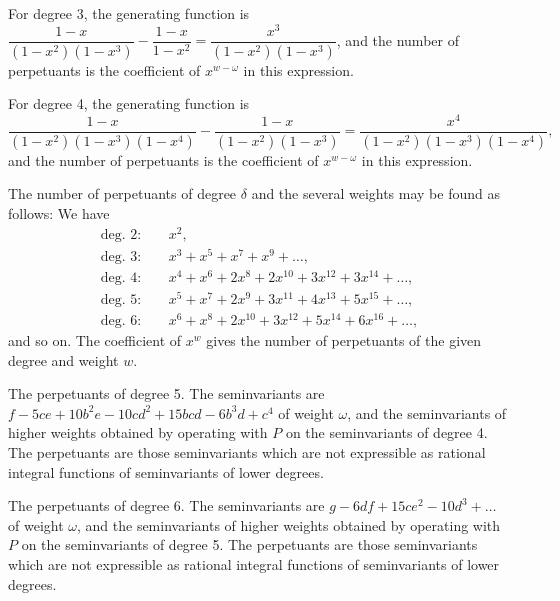 \documentclass[11pt,a4paper]{book}
\begin{document}
{{{\begin{art}
For degree 3, the generating function is $\dfrac{1 - x}{(1 - x^{2})(1 - x^{3})} - \dfrac{1 - x}{1 - x^{2}} = \dfrac{x^{3}}{(1 - x^{2})(1 - x^{3})}$, and the number of perpetuants is the coefficient of $x^{w - \omega}$ in this expression.

For degree 4, the generating function is
\[
\frac{1 - x}{(1 - x^{2})(1 - x^{3})(1 - x^{4})} - \frac{1 - x}{(1 - x^{2})(1 - x^{3})} = \frac{x^{4}}{(1 - x^{2})(1 - x^{3})(1 - x^{4})},
\]
and the number of perpetuants is the coefficient of $x^{w - \omega}$ in this expression.
\end{art}

\setcounter{art}{59}
\begin{art}
The number of perpetuants of degree $\delta$ and the several weights may be found as follows: We have
\begin{align*}
\text{deg. } 2:\quad & x^{2},\\
\text{deg. } 3:\quad & x^{3} + x^{5} + x^{7} + x^{9} + \ldots,\\
\text{deg. } 4:\quad & x^{4} + x^{6} + 2x^{8} + 2x^{10} + 3x^{12} + 3x^{14} + \ldots,\\
\text{deg. } 5:\quad & x^{5} + x^{7} + 2x^{9} + 3x^{11} + 4x^{13} + 5x^{15} + \ldots,\\
\text{deg. } 6:\quad & x^{6} + x^{8} + 2x^{10} + 3x^{12} + 5x^{14} + 6x^{16} + \ldots,
\end{align*}
and so on. The coefficient of $x^{w}$ gives the number of perpetuants of the given degree and weight $w$.
\end{art}

\setcounter{art}{60}
\begin{art}
The perpetuants of degree 5. The seminvariants are $f - 5ce + 10b^{2}e - 10cd^{2} + 15bcd - 6b^{3}d + c^{4}$ of weight $\omega$, and the seminvariants of higher weights obtained by operating with $P$ on the seminvariants of degree 4. The perpetuants are those seminvariants which are not expressible as rational integral functions of seminvariants of lower degrees.
\end{art}

\setcounter{art}{61}
\begin{art}
The perpetuants of degree 6. The seminvariants are $g - 6df + 15ce^{2} - 10d^{3} + \ldots$ of weight $\omega$, and the seminvariants of higher weights obtained by operating with $P$ on the seminvariants of degree 5. The perpetuants are those seminvariants which are not expressible as rational integral functions of seminvariants of lower degrees.
\end{art}

}}}
\end{document}
